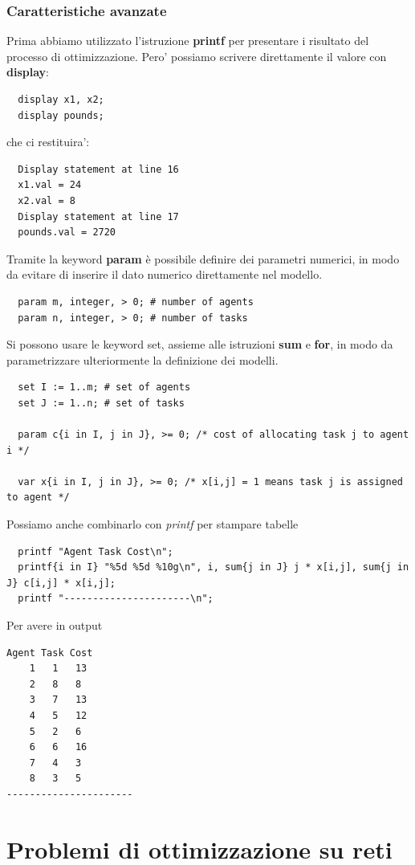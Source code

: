 \documentclass[a4paper,12pt]{article}
\begin{document}
\subsubsection{Caratteristiche avanzate}
Prima abbiamo utilizzato l'istruzione \textbf{printf} per presentare i risultato del processo di ottimizzazione. Pero' possiamo scrivere direttamente il valore con \textbf{display}:
\begin{lstlisting}
  display x1, x2;
  display pounds;
\end{lstlisting}
che ci restituira':
\begin{lstlisting}
  Display statement at line 16
  x1.val = 24
  x2.val = 8
  Display statement at line 17
  pounds.val = 2720
\end{lstlisting}
\vspace{1px}
Tramite la keyword \textbf{param} è possibile definire dei parametri numerici, in modo da evitare di inserire il dato numerico direttamente nel modello.
\begin{lstlisting}
  param m, integer, > 0; # number of agents
  param n, integer, > 0; # number of tasks
\end{lstlisting}
Si possono usare le keyword set, assieme alle istruzioni \textbf{sum} e \textbf{for}, in modo da parametrizzare ulteriormente la definizione dei modelli.
\begin{lstlisting}
  set I := 1..m; # set of agents
  set J := 1..n; # set of tasks

  param c{i in I, j in J}, >= 0; /* cost of allocating task j to agent i */
  
  var x{i in I, j in J}, >= 0; /* x[i,j] = 1 means task j is assigned to agent */
\end{lstlisting}
Possiamo anche combinarlo con \textit{printf} per stampare tabelle
\begin{lstlisting}
  printf "Agent Task Cost\n";
  printf{i in I} "%5d %5d %10g\n", i, sum{j in J} j * x[i,j], sum{j in J} c[i,j] * x[i,j];
  printf "----------------------\n";
\end{lstlisting}
Per avere in output
\begin{lstlisting}
Agent Task Cost
    1   1   13
    2   8   8
    3   7   13
    4   5   12
    5   2   6
    6   6   16
    7   4   3
    8   3   5
----------------------
\end{lstlisting}
\section{Problemi di ottimizzazione su reti}
\end{document}
